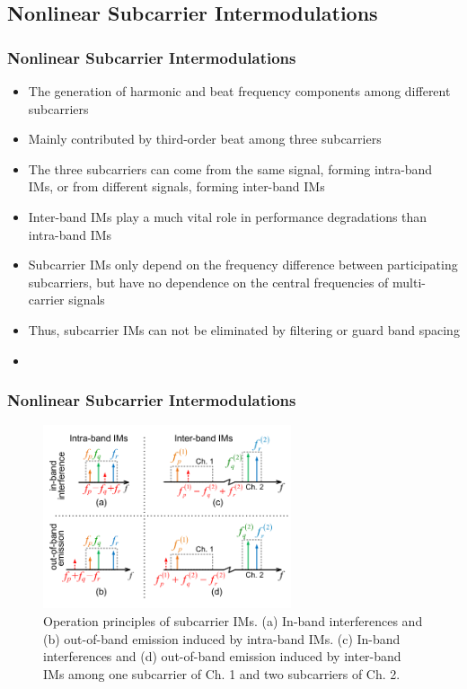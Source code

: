 \documentclass[t]{beamer}
\begin{document}
\subsection{Nonlinear Subcarrier Intermodulations}

\begin{frame}
    \frametitle{Nonlinear Subcarrier Intermodulations~\cite{Wang2017}}
    \begin{itemize}
        \item The generation of harmonic and beat frequency components among different subcarriers
        \item Mainly contributed by third-order beat among three subcarriers
        \item The three subcarriers can come from the same signal, forming intra-band IMs, or from different signals, forming inter-band IMs
        \item Inter-band IMs play a much vital role in performance degradations than intra-band IMs
        \item Subcarrier IMs only depend on the frequency difference between participating subcarriers, but have no dependence on the central frequencies of multi-carrier signals
        \item Thus, subcarrier IMs can not be eliminated by filtering or guard band spacing
        \item 
    \end{itemize}
\end{frame}
\begin{frame}
    \frametitle{Nonlinear Subcarrier Intermodulations~\cite{Wang2017}}

    \begin{figure}[h]

        \includegraphics[width=0.65\textwidth]{IM}
        \caption{Operation principles of subcarrier IMs. (a) In-band interferences and (b) out-of-band emission induced by intra-band IMs. (c) In-band interferences and (d) out-of-band emission induced by inter-band IMs among one subcarrier of Ch. 1 and two subcarriers of Ch. 2.}
    \end{figure}
    
    
\end{frame}
\end{document}
